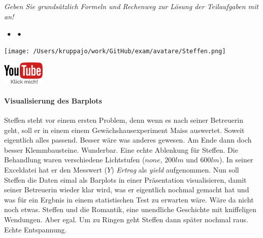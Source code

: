 \documentclass[a4paper, 9pt]{scrartcl}\usepackage[]{graphicx}\usepackage[]{xcolor}
\begin{document}
\textit{Geben Sie grundsätzlich Formeln und Rechenweg zur Lösung der Teilaufgaben mit an!} \\[1Ex]
 

 
\ifcollection
\begin{flushright}
\tiny\vspace{-3Ex}
\textbf{\examinhaltstart}
\exammodulemathstat $\;\bullet$
\exammodulestat $\;\bullet$
\exammodulestatbbv 
\vspace{-4Ex}
\end{flushright}
\begin{minipage}[t]{0.5\textwidth}
\texttt{[image: /Users/kruppajo/work/GitHub/exam/avatare/Steffen.png]}
\end{minipage}
\begin{minipage}[t]{0.5\textwidth}
\hfill
\href{https://youtu.be/vXnLttRL_VI}{\includegraphics[width = 2cm]{img/youtube}}
\end{minipage}
\vspace{-3ex}
\fi



\ifcollection
\paragraph{Visualisierung des Barplots}
\fi

Steffen steht vor einem ersten Problem, denn wenn es nach seiner Betreuerin geht, soll er in einem einem Gewächshausexperiment Maiss auswertet. Soweit eigentlich alles passend. Besser wäre was anderes gewesen. Am Ende dann doch besser Klemmbausteine. Wunderbar. Eine echte Ablenkung für Steffen. Die Behandlung waren verschiedene Lichtstufen ($none$, $200lm$ und $600lm$). In seiner Exceldatei hat er den Messwert ($Y$) \textit{Ertrag} als \textit{yield} aufgenommen. Nun soll Steffen die Daten eimal als Barplots in einer Präsentation visualisieren, damit seiner Betreuerin wieder klar wird, was er eigentlich nochmal gemacht hat und was für ein Ergbnis in einem statistischen Test zu erwarten wäre. Wäre da nicht noch etwas. Steffen und die Romantik, eine unendliche Geschichte mit kniffeligen Wendungen. Aber egal. Um zu Ringen geht Steffen dann später nochmal raus. Echte Entspannung.
\end{document}
